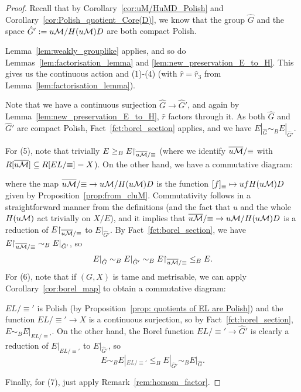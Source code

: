 	\begin{proof}
		Recall that by Corollary~\ref{cor:uM/HuMD_Polish} and Corollary~\ref{cor:Polish_quotient_Core(D)}, we know that the group $\hat G$ and the space $\hat G':=u{\mathcal M}/H(u{\mathcal M})D$ are both compact Polish.
		
		Lemma~\ref{lem:weakly_grouplike} applies, and so do Lemmas~\ref{lem:factorisation_lemma} and \ref{lem:new_preservation_E_to_H}. This gives us the continuous action and (1)-(4) (with $\hat r=\hat r_3$ from Lemma~\ref{lem:factorisation_lemma}).
		
		Note that we have a continuous surjection $\hat G\to \hat G'$, and again by Lemma~\ref{lem:new_preservation_E_to_H}, $\hat r$ factors through it. As both $\hat G$ and $\hat G'$ are compact Polish, Fact~\ref{fct:borel_section} applies, and we have $E|_{\hat G}\sim_B E|_{\hat G'}$.
		
		For (5), note that trivially $E\geq_B E\mathord{\upharpoonright} _{\overline{u{\mathcal M}}/{\equiv}}$ (where we identify $\overline{u{\mathcal M}}/{\equiv}$ with $R[\overline{u{\mathcal M}}]\subseteq R[EL/{\equiv}]=X$). On the other hand, we have a commutative diagram:
		\begin{center}
		\end{center}
		where the map $\overline{u{\mathcal M}}/{\equiv}\to u{\mathcal M}/H(u{\mathcal M})D$ is the function $[f]_{\equiv}\mapsto ufH(u{\mathcal M})D$ given by Proposition~\ref{prop:from_cluM}. Commutativity follows in a straightforward manner from the definitions  (and the fact that $u$ and the whole $H(u{\mathcal M})$ act trivially on $X/E$), and it implies that $\overline{u{\mathcal M}}/{\equiv}\to u{\mathcal M}/H(u{\mathcal M})D$ is a reduction of $E\mathord{\upharpoonright} _{\overline{u{\mathcal M}}/{\equiv}}$ to $E|_{\hat G'}$. By Fact~\ref{fct:borel_section}, we have $E\mathord{\upharpoonright} _{\overline{u{\mathcal M}}/{\equiv}}\sim_B E|_{\hat G'}$, so
		\[
			E|_{\hat G}\sim_BE|_{\hat G'}\sim_B E\mathord{\upharpoonright} _{\overline{u{\mathcal M}}/{\equiv}}\leq_B E.
		\]
		For (6), note that if $(G,X)$ is tame and metrisable, we can apply Corollary~\ref{cor:borel_map} to obtain a commutative diagram:
		\begin{center}
		\end{center}
		$EL/{\equiv'}$ is Polish (by Proposition~\ref{prop: quotients of EL are Polish}) and the function $EL/{\equiv'}\to X$ is a continuous surjection, so by Fact~\ref{fct:borel_section}, $E\sim_B E|_{EL/{\equiv'}}$. On the other hand, the Borel function $EL/{\equiv'}\to \hat G'$ is clearly a reduction of $E|_{EL/{\equiv'}}$ to $E|_{\hat G'}$, so
		\[
			E\sim_B E|_{EL/{\equiv'}}\leq_B E|_{\hat G'}\sim_B E|_{\hat G}.
		\]
		
		Finally, for (7), just apply Remark~\ref{rem:homom_factor}.
	\end{proof}
	
